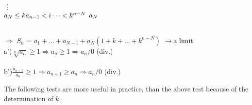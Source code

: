 \documentclass[11pt]{amsbook}
\begin{document}
    \hspace{60 pt}\vdots\\
 
    \hspace{50 pt}${a_{N}} \leq  k   {a_{n-1}} <i \dots<  k^{n-N} \hspace{5 pt} {a_N}$\\\\
    \par\noindent
        \quad$\Rightarrow$ \hspace{15 pt}${S_n}$ = ${a_1}+\dots+{a_{N-1}}+{a_N}(1+k+\dots+{k^{n-N}})$ \quad$\rightarrow$\quad a limit\\

    a')\hspace{15 pt}$\sqrt[n]{{a_n}} \geq 1 \Longrightarrow {a_n} \geq 1 \Longrightarrow {a_n} / 0$ \hspace{10 pt} (div.)\\\\

    b')\hspace{15 pt}$\frac{{a_{n+1}}}{a_n} \geq 1 \Longrightarrow {a_{n+1}} \geq {a_n} \Longrightarrow {a_n} / 0$ \hspace{10 pt} (div.)\\
    
    \par
    The following tests are more useful in practice, than the above test because of the determination of $k$.
    \par
\end{document}
